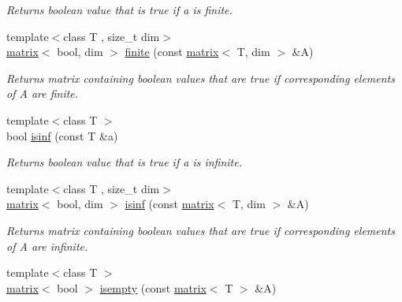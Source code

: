 \begin{DoxyCompactItemize}
\begin{DoxyCompactList}\small\item\em Returns boolean value that is true if a is finite. \end{DoxyCompactList}\item 
\hypertarget{namespacekeycpp_a047f1d1e201235ae75156016fc5b7edf}{{\footnotesize template$<$class T , size\-\_\-t dim$>$ }\\\hyperlink{classkeycpp_1_1matrix}{matrix}$<$ bool, dim $>$ \hyperlink{namespacekeycpp_a047f1d1e201235ae75156016fc5b7edf}{finite} (const \hyperlink{classkeycpp_1_1matrix}{matrix}$<$ T, dim $>$ \&A)}\label{namespacekeycpp_a047f1d1e201235ae75156016fc5b7edf}

\begin{DoxyCompactList}\small\item\em Returns matrix containing boolean values that are true if corresponding elements of A are finite. \end{DoxyCompactList}\item 
\hypertarget{namespacekeycpp_a852be6145adcca15ceaeb5a138651e20}{{\footnotesize template$<$class T $>$ }\\bool \hyperlink{namespacekeycpp_a852be6145adcca15ceaeb5a138651e20}{isinf} (const T \&a)}\label{namespacekeycpp_a852be6145adcca15ceaeb5a138651e20}

\begin{DoxyCompactList}\small\item\em Returns boolean value that is true if a is infinite. \end{DoxyCompactList}\item 
\hypertarget{namespacekeycpp_a606c5ce0dc3b7ec19ec18f3bbc21d4f2}{{\footnotesize template$<$class T , size\-\_\-t dim$>$ }\\\hyperlink{classkeycpp_1_1matrix}{matrix}$<$ bool, dim $>$ \hyperlink{namespacekeycpp_a606c5ce0dc3b7ec19ec18f3bbc21d4f2}{isinf} (const \hyperlink{classkeycpp_1_1matrix}{matrix}$<$ T, dim $>$ \&A)}\label{namespacekeycpp_a606c5ce0dc3b7ec19ec18f3bbc21d4f2}

\begin{DoxyCompactList}\small\item\em Returns matrix containing boolean values that are true if corresponding elements of A are infinite. \end{DoxyCompactList}\item 
\hypertarget{namespacekeycpp_acc2de8926c54a2048a0d8965e7d70995}{{\footnotesize template$<$class T $>$ }\\\hyperlink{classkeycpp_1_1matrix}{matrix}$<$ bool $>$ \hyperlink{namespacekeycpp_acc2de8926c54a2048a0d8965e7d70995}{isempty} (const \hyperlink{classkeycpp_1_1matrix}{matrix}$<$ T $>$ \&A)}\label{namespacekeycpp_acc2de8926c54a2048a0d8965e7d70995}


\end{DoxyCompactItemize}
